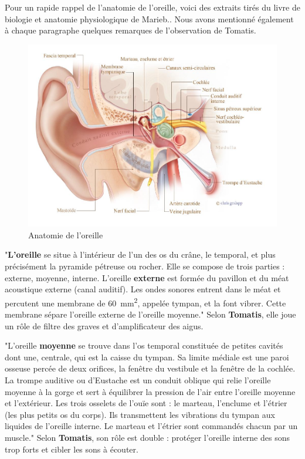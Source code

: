 Pour un rapide rappel de l'anatomie de l'oreille, voici des extraits tirés du livre de biologie et anatomie
physiologique de  Marieb.\autocite {marieb:biologie}. Nous avons mentionné également à chaque 
paragraphe quelques  remarques de l'observation de Tomatis.
\begin{figure}
	\centering
	\includegraphics[width=1\linewidth]{images/20160624Berufsfeldgruppen.jpg}
	\caption[Anatomie oreille]{Anatomie de l'oreille}
	\label{fig:-20160624berufsfeldgruppen}
\end{figure}

"\textbf{L'oreille}
se situe à l'intérieur de l'un des os du crâne, le temporal, et plus précisément la pyramide pétreuse ou rocher. Elle se compose de trois parties : externe, moyenne, interne.
L'oreille \textbf{externe} 
est formée du pavillon et du méat acoustique externe
	(canal auditif). Les ondes sonores entrent dans le méat et percutent
	une membrane de \SI{60}{\milli\metre\squared}, appelée tympan, et la font vibrer.
	Cette membrane
	sépare l'oreille externe de l'oreille moyenne."\autocite[ 319--321.]{marieb:biologie}
	Selon \textbf{Tomatis}, elle
	joue un rôle de filtre des graves et d'amplificateur des aigus.
	

"L'oreille \textbf{moyenne }se trouve dans l'os temporal constituée de petites
cavités dont une, centrale, qui est la caisse du tympan. Sa limite
médiale est une paroi osseuse percée de deux orifices, la fenêtre
du vestibule et la fenêtre de la cochlée. La trompe auditive ou d'Eustache
est un conduit oblique qui relie l'oreille moyenne à la gorge et sert
à équilibrer la pression de l'air entre l'oreille moyenne et l'extérieur.
Les trois osselets de l'ouïe sont : le marteau, l'enclume et l'étrier
(les plus petits os du corps). Ils transmettent les vibrations du
tympan aux liquides de l'oreille interne.
Le marteau et l'étrier sont commandés chacun par un muscle."\autocite[319--321.]{marieb:biologie}
Selon \textbf{Tomatis}, son rôle est double : protéger l'oreille interne des sons
trop forts et cibler les sons à écouter.

